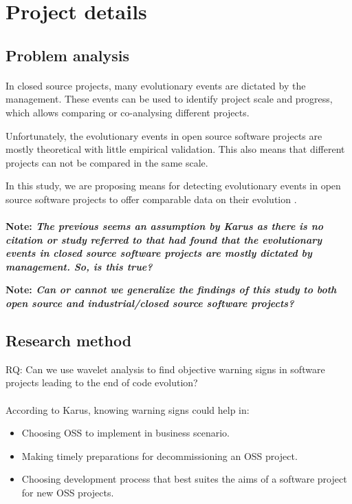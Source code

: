 \section{Project details}

\subsection{Problem analysis}
\paragraph{}
In closed source projects, many evolutionary events are dictated by the
management. These events can be used to identify project scale and progress,
which allows comparing or co-analysing different projects.

Unfortunately, the evolutionary events in open source software projects are
mostly theoretical with little empirical validation. This also means that
different projects can not be compared in the same scale.

In this study, we are proposing means for detecting evolutionary events in open
source software projects to offer comparable data on their evolution
\cite{karus2013}.

\paragraph{}
\bf{Note: }\rm \emph{The previous seems an assumption by Karus as there is no
citation or study referred to that had found that the evolutionary events in closed source
software projects are mostly dictated by management. So, is this true?}

\bf{Note: }\rm \emph{Can or cannot we generalize the findings of this study to
both open source and industrial/closed source software projects?}

\subsection{Research method}
RQ: Can we use wavelet analysis to find objective warning signs in software
projects leading to the end of code evolution? \cite{karus2013}

\paragraph{}
According to Karus, knowing warning signs could help in:
\begin{itemize}
	\item Choosing OSS to implement in business scenario.
	\item Making timely preparations for decommissioning an OSS project.
	\item Choosing development process that best suites the aims of a software
	project for new OSS projects.
\end{itemize}


